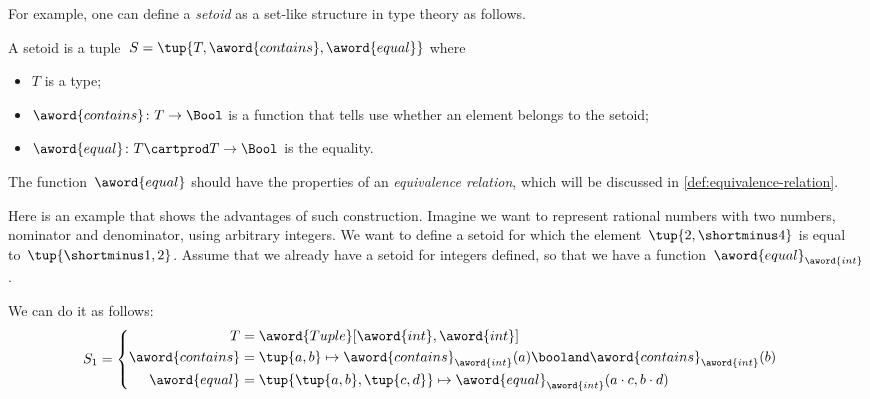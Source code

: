 For example, one can define a \emph{setoid} as a set-like structure in type theory as follows.

\begin{ctdefinition}[Setoid]
    A setoid is a tuple~$S = \tup{T, \aword{contains}, \aword{equal}}$ where
    \begin{itemize}
        \item $T$ is a type;
        \item $\aword{contains}\colon T\to\Bool$ is a function that tells use whether an element belongs to the setoid;
        \item $\aword{equal}\colon T\cartprod T\to\Bool$ is the equality.
    \end{itemize}
\end{ctdefinition}
The function~$\aword{equal}$ should have the properties of an \emph{equivalence relation},
which will be discussed in \cref{def:equivalence-relation}.

Here is an example that shows the advantages of such construction.
Imagine we want to represent rational numbers with two numbers, nominator and denominator, using arbitrary integers.
We want to define a setoid for which the element~$\tup{2, \shortminus 4}$ is equal to~$\tup{ \shortminus  1, 2}$.
Assume that we already have a setoid for integers defined, so that we have a function~$\aword{equal}_{\aword{int}}$.

We can do it as follows:
\begin{equation*}
    S_1 =
    \begin{cases}
        \begin{aligned}
            T                & =
            \aword{Tuple}[\aword{int}, \aword{int}]
            \\
            \aword{contains} & = \tup{a,b} \mapsto \aword{contains}_{\aword{int}}(a)  \booland \aword{contains}_{\aword{int}}(b)
            \\
            \aword{equal}    & = \tup{\tup{a,b}, \tup{c,d}}
            \mapsto \aword{equal}_{\aword{int}} (a\cdot c, b\cdot d)
        \end{aligned}
    \end{cases}
\end{equation*}

